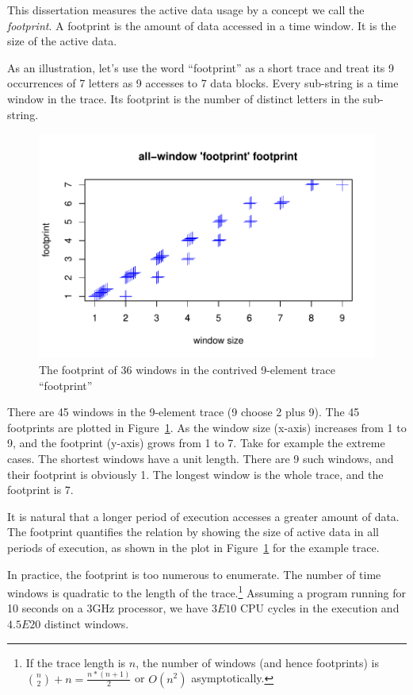 This dissertation measures the active data usage by a concept we call
the \emph{footprint}.  A footprint is the amount of data accessed in a
time window.  It is the size of the active data.  

As an illustration, let's use the
word ``footprint'' as a short trace and treat its 9 occurrences of 7 letters
as 9 accesses to 7 data blocks.  Every sub-string is a time window in the trace.  Its footprint is the number of
distinct letters in the sub-string.  

\begin{figure}[h]
\centering
\includegraphics[width=14cm]{figures/intro/footprintfp}
\caption{The footprint of 36 windows in the contrived 9-element trace ``footprint''}
\label{fig:fpfp}
\end{figure}

There are 45 windows in the 9-element trace (9 choose 2 plus 9).  The 45 footprints are
plotted in Figure~\ref{fig:fpfp}.  As the window size (x-axis) increases from
1 to 9, and the footprint (y-axis) grows from 1 to 7.  Take for example the extreme cases.  The shortest
windows have a unit length.  There are 9 such windows, and their
footprint is obviously 1.  The longest
window is the whole trace, and the footprint is 7.  

It is natural that a longer period of execution accesses 
a greater amount of data.  The footprint quantifies the relation by showing the size of active data in all periods of
execution, as shown in the plot in Figure~\ref{fig:fpfp} for
the example trace.  

In practice, the footprint is too numerous to enumerate.  The
number of time windows is quadratic to the length of the
trace.\footnote{If the trace length is $n$, the number of windows (and
  hence footprints) is ${{n}\choose{2}} + n = \frac{n*(n+1)}{2}$ or $O(n^2)$ asymptotically.}
Assuming a program running for 10
seconds on a 3GHz processor, we have $3E10$ CPU cycles in
the execution and $4.5E20$
distinct windows.  

